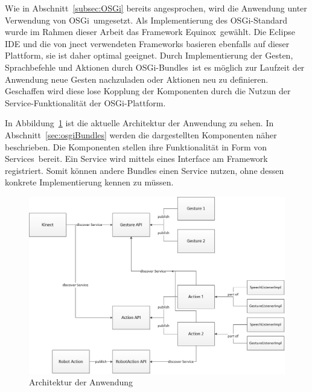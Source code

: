 Wie in Abschnitt~\ref{subsec:OSGi} bereits angesprochen, wird die Anwendung unter Verwendung von OSGi~\footnotemark[1] umgesetzt. Als Implementierung des OSGi-Standard wurde im Rahmen dieser Arbeit das Framework Equinox~\footnotemark[2] gew\"ahlt. Die Eclipse IDE und die von jnect verwendeten Frameworks basieren ebenfalls auf dieser Plattform, sie ist daher optimal geeignet. Durch Implementierung der Gesten, Sprachbefehle und Aktionen durch OSGi-Bundles~\footnotemark[3] ist es m\"oglich zur Laufzeit der Anwendung neue Gesten nachzuladen oder Aktionen neu zu definieren. Geschaffen wird diese lose Kopplung der Komponenten durch die Nutzun der Service-Funktionalit\"at der OSGi-Plattform.

In Abbildung~\ref{fig:osgiArchitecture} ist die aktuelle Architektur der Anwendung zu sehen. In Abschnitt~\ref{sec:osgiBundles} werden die dargestellten Komponenten n\"aher beschrieben. Die Komponenten stellen ihre Funktionalit\"at in Form von Services~\footnotemark[3] bereit. Ein Service wird mittels eines Interface am Framework registriert. Somit k\"onnen andere Bundles einen Service nutzen, ohne dessen konkrete Implementierung 
kennen zu m\"ussen.


\begin{figure}[htb]
\centering
\includegraphics[width=1\textwidth]{img/09kapitel/osgi-architecture.png}
\caption[Anwendungsarchitektur]{Architektur der Anwendung}
\label{fig:osgiArchitecture}
\end{figure}

